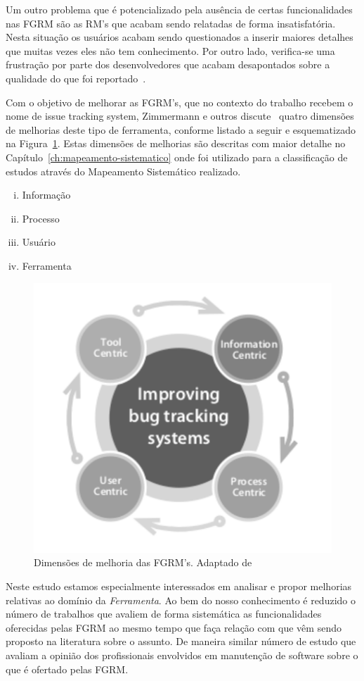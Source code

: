Um outro problema que é potencializado pela ausência de certas funcionalidades
nas FGRM são as RM's que acabam sendo relatadas de forma insatisfatória. Nesta
situação os usuários acabam sendo questionados a inserir maiores detalhes que
muitas vezes eles não tem conhecimento. Por outro lado, verifica-se uma
frustração por parte dos desenvolvedores que acabam desapontados sobre a
qualidade do que foi reportado~\cite{just2008towards}.

Com o objetivo de melhorar as FGRM's, que no contexto do trabalho recebem o nome
de issue tracking system, Zimmermann e outros
discute~\cite{zimmermann2009improving} quatro dimensões de melhorias deste tipo
de ferramenta, conforme listado a seguir e esquematizado na
Figura~\ref{fig:dimensoes_melhorias_fgrm}. Estas dimensões de melhorias são
descritas com maior detalhe no Capítulo~\ref{ch:mapeamento-sistematico} onde foi
utilizado para a classificação de estudos através do Mapeamento Sistemático
realizado.

\begin{enumerate} [(i)]
	\item{Informação}
	\item{Processo}
	\item{Usuário}
	\item{Ferramenta}
\end{enumerate}

\begin{figure}[htpb] \centering
	\includegraphics[width=0.666666\linewidth]
	{chapter-intro/img/dimensoes_melhorias_fgrm.pdf}
	\caption{Dimensões de melhoria das FGRM's. Adaptado
		de~\cite{zimmermann2005mining}}\label{fig:dimensoes_melhorias_fgrm}
\end{figure}

Neste estudo estamos especialmente interessados em analisar e propor melhorias
relativas ao domínio da \textit{Ferramenta}. Ao bem do nosso conhecimento é
reduzido o número de trabalhos que avaliem de forma sistemática as
funcionalidades oferecidas pelas FGRM ao mesmo tempo que faça relação com que
vêm sendo proposto na literatura sobre o assunto. De maneira similar número de
estudo que avaliam a opinião dos profissionais envolvidos em manutenção de
software sobre o que é ofertado pelas FGRM\@.

